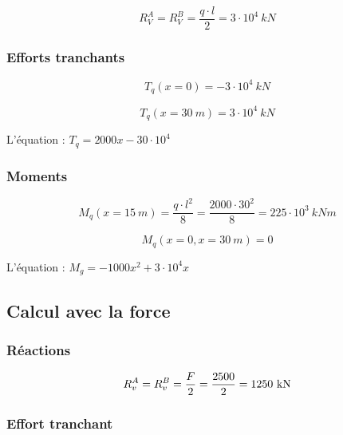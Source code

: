 \documentclass[12pt,a4paper]{article}
\begin{document}
	\[ R_{V}^{A} = R_{V}^{B} = \dfrac{q \cdot l}{2} = 3 \cdot 10^{4} ~\unit{kN} \]
	
	\subsubsection{Efforts tranchants}
	
	\[ T_{q}(x = 0) =  - 3 \cdot 10^{4} ~\unit{kN} \]
	
	\[ T_{q}(x = 30 ~\unit{m}) = 3 \cdot 10^{4} ~\unit{kN} \]
	
	\vspace{\baselineskip}
	
	L'équation : $T_{q} = 2000x - 30 \cdot 10^{4}$
	
	\subsubsection{Moments}
	
	
	\[ M_{q}(x = 15 ~\unit{m}) = \dfrac{q \cdot l^{2}}{8} = \dfrac{2000 \cdot 30^{2}}{8} = 225 \cdot 10^{3} ~\unit{kNm} \]
	
	\[ M_{q}(x = 0,x = 30 ~\unit{m}) = 0 \]
	
	\vspace{\baselineskip}
	
	L'équation : $M_{g} =  - 1000x^{2} + 3 \cdot 10^{4}x$


	\subsection{Calcul avec la force}
	

	\subsubsection{Réactions}

	
	\[ R_{v}^{A} = R_{v}^{B} = \dfrac{F}{2} = \dfrac{2500}{2} = 1250\kn \]

	
	\subsubsection{Effort tranchant}
	
	\begin{center}
	\end{center}
\end{document}
